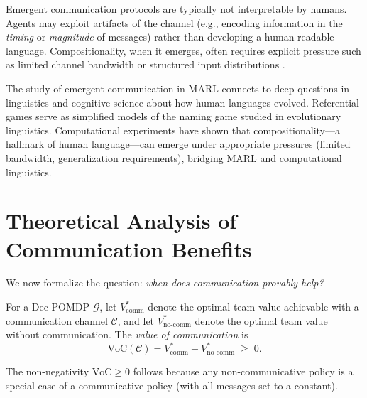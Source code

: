 \documentclass[11pt,a4paper]{article}
\begin{document}
\begin{warning}
Emergent communication protocols are typically not interpretable
by humans.  Agents may exploit artifacts of the channel (e.g.,
encoding information in the \emph{timing} or \emph{magnitude}
of messages) rather than developing a human-readable language.
Compositionality, when it emerges, often requires explicit
pressure such as limited channel bandwidth or structured input
distributions \citep{lazaridou2017}.
\end{warning}

\begin{rlconnection}[title={Emergent Communication and Language
    Evolution}]
The study of emergent communication in MARL connects to deep
questions in linguistics and cognitive science about how human
languages evolved.  Referential games serve as simplified models
of the naming game studied in evolutionary linguistics.
Computational experiments have shown that compositionality---a
hallmark of human language---can emerge under appropriate
pressures (limited bandwidth, generalization requirements),
bridging MARL and computational linguistics.
\end{rlconnection}

\section{Theoretical Analysis of Communication Benefits}
\label{sec:theory}

We now formalize the question: \emph{when does communication
provably help?}

\begin{definition}
\label{def:voc}
For a Dec-POMDP $\mathcal{G}$, let $V^*_{\mathrm{comm}}$ denote
the optimal team value achievable with a communication channel
$\mathcal{C}$, and let $V^*_{\mathrm{no\text{-}comm}}$ denote
the optimal team value without communication.  The \emph{value
of communication} is
\[
  \mathrm{VoC}(\mathcal{C}) = V^*_{\mathrm{comm}} -
  V^*_{\mathrm{no\text{-}comm}} \;\geq\; 0.
\]
\end{definition}

The non-negativity $\mathrm{VoC} \geq 0$ follows because any
non-communicative policy is a special case of a communicative
policy (with all messages set to a constant).
\end{document}
